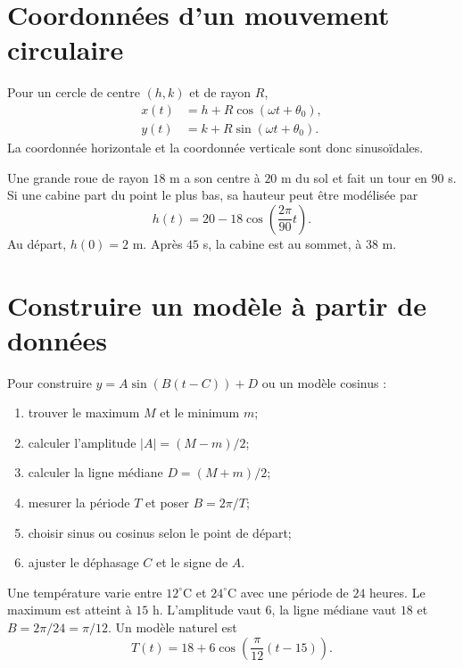 \documentclass[12pt,a4paper,openany]{book}
\newcommand{\abs}[1]{\left\lvert #1\right\rvert}
\begin{document}
\section{Coordonnées d'un mouvement circulaire}

Pour un cercle de centre $(h,k)$ et de rayon $R$,
\begin{align*}
x(t)&=h+R\cos(\omega t+\theta_0),\\
y(t)&=k+R\sin(\omega t+\theta_0).
\end{align*}
La coordonnée horizontale et la coordonnée verticale sont donc sinusoïdales.

\begin{examplebox}
Une grande roue de rayon $18$ m a son centre à $20$ m du sol et fait un tour en $90$ s. Si une cabine part du point le plus bas, sa hauteur peut être modélisée par
\[
h(t)=20-18\cos\left(\frac{2\pi}{90}t\right).
\]
Au départ, $h(0)=2$ m. Après $45$ s, la cabine est au sommet, à $38$ m.
\end{examplebox}

\section{Construire un modèle à partir de données}

\begin{methodbox}
Pour construire $y=A\sin(B(t-C))+D$ ou un modèle cosinus :
\begin{enumerate}
\item trouver le maximum $M$ et le minimum $m$;
\item calculer l'amplitude $\abs A=(M-m)/2$;
\item calculer la ligne médiane $D=(M+m)/2$;
\item mesurer la période $T$ et poser $B=2\pi/T$;
\item choisir sinus ou cosinus selon le point de départ;
\item ajuster le déphasage $C$ et le signe de $A$.
\end{enumerate}
\end{methodbox}

\begin{examplebox}
Une température varie entre $12^\circ$C et $24^\circ$C avec une période de $24$ heures. Le maximum est atteint à $15$ h. L'amplitude vaut $6$, la ligne médiane vaut $18$ et $B=2\pi/24=\pi/12$. Un modèle naturel est
\[
T(t)=18+6\cos\left(\frac\pi{12}(t-15)\right).
\]
\end{examplebox}
\end{document}

